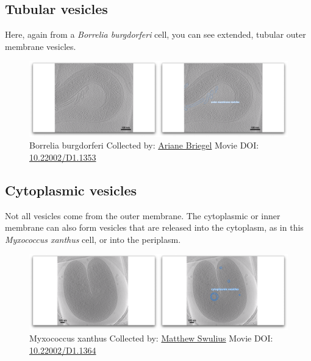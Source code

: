 \documentclass[]{tufte-book}
\begin{document}
\hypertarget{Tubular_vesicles}{\subsection{Tubular
vesicles}\label{Tubular_vesicles}}

Here, again from a \emph{Borrelia burgdorferi} cell, you can see
extended, tubular outer membrane vesicles.





\begin{figure}
\includegraphics{movie_stills/2_4b} \caption[Borrelia burgdorferi Collected by:
\protect\hyperlink{ariane_briegel}{Ariane Briegel} Movie DOI:
\href{https://doi.org/10.22002/D1.1353}{10.22002/D1.1353}]{Borrelia burgdorferi Collected by:
\protect\hyperlink{ariane_briegel}{Ariane Briegel} Movie DOI:
\href{https://doi.org/10.22002/D1.1353}{10.22002/D1.1353}}\label{fig:2-4b}
\end{figure}

\hypertarget{Cytoplasmic_vesicles}{\subsection{Cytoplasmic
vesicles}\label{Cytoplasmic_vesicles}}

Not all vesicles come from the outer membrane. The cytoplasmic or inner
membrane can also form vesicles that are released into the cytoplasm, as
in this \emph{Myxococcus xanthus} cell, or into the periplasm.





\begin{figure}
\includegraphics{movie_stills/2_4c} \caption[Myxococcus xanthus Collected by:
\protect\hyperlink{matthew_swulius}{Matthew Swulius} Movie DOI:
\href{https://doi.org/10.22002/D1.1364}{10.22002/D1.1364}]{Myxococcus xanthus Collected by:
\protect\hyperlink{matthew_swulius}{Matthew Swulius} Movie DOI:
\href{https://doi.org/10.22002/D1.1364}{10.22002/D1.1364}}\label{fig:2-4c}
\end{figure}
\end{document}
